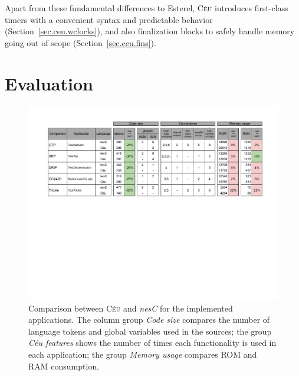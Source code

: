 \documentclass[letterpaper]{sig-alternate}
\newcommand{\CEU}{\textsc{C\'{e}u}\xspace}
\begin{document}
Apart from these fundamental differences to Esterel, \CEU introduces 
first-class timers with a convenient syntax and predictable behavior 
(Section~\ref{sec.ceu.wclocks}), and also finalization blocks to safely handle 
memory going out of scope (Section~\ref{sec.ceu.fins}).



\section{Evaluation}
\label{sec.eval}

\begin{figure}[t]
\includegraphics[width=\textwidth,clip=true,trim=55px 320px 45px 0px]{eval}
\caption{ Comparison between \CEU and \emph{nesC} for the implemented 
applications. \newline
{\small %
The column group \emph{Code size} compares the number of language tokens and 
global variables used in the sources;
the group \emph{C\'eu features} shows the number of times each functionality is 
used in each application;
the group \emph{Memory usage} compares ROM and RAM consumption.
}%
\label{fig.eval}
}
\end{figure}
\end{document}
